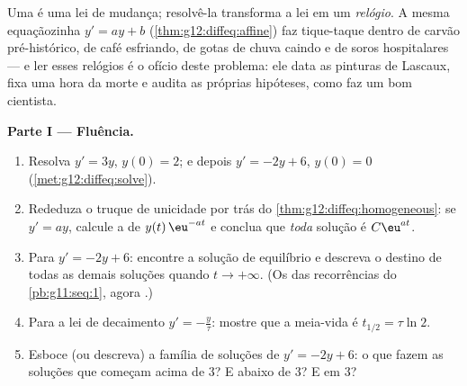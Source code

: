 \begin{problem}
\label{pb:g12:diffeq:1}
Uma  é uma lei de mudança; resolvê-la transforma
a lei em um \emph{relógio}. A mesma equaçãozinha $y' = ay + b$
(\cref{thm:g12:diffeq:affine}) faz tique-taque dentro de carvão
pré-histórico, de café esfriando, de gotas de chuva caindo e de
soros hospitalares --- e ler esses relógios é o ofício deste
problema: ele data as pinturas de Lascaux, fixa uma hora da morte e
audita as próprias hipóteses, como faz um bom cientista.

\medskip
\noindent\textbf{Parte I --- Fluência.}
\begin{enumerate}
  \item Resolva $y' = 3y$, $y(0) = 2$; e depois
        $y' = -2y + 6$, $y(0) = 0$
        (\cref{met:g12:diffeq:solve}).
  \item Rededuza o truque de unicidade por trás do
        \cref{thm:g12:diffeq:homogeneous}: se $y' = ay$, calcule
        a  de $y(t)\,\eu^{-at}$ e conclua que
        \emph{toda} solução é $C\eu^{at}$.
  \item Para $y' = -2y + 6$: encontre a solução de equilíbrio e
        descreva o destino de todas as demais soluções quando
        $t \to +\infty$. (Os  das recorrências do
        \cref{pb:g11:seq:1}, agora .)
  \item Para a lei de decaimento $y' = -\frac{y}{\tau}$: mostre
        que a meia-vida é $t_{1/2} = \tau \ln 2$.
  \item Esboce (ou descreva) a família de soluções de
        $y' = -2y + 6$: o que fazem as soluções que começam acima
        de $3$? E abaixo de $3$? E em $3$?
\end{enumerate}


\end{problem}
